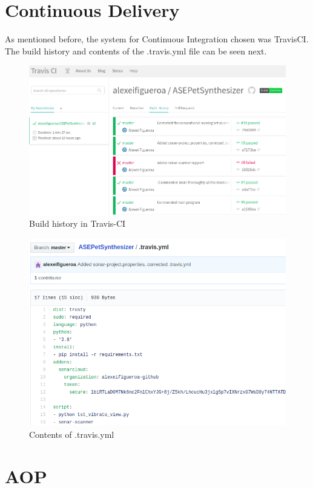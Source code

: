 \documentclass[margin,line,a4paper,authoryear,12pt]{report}
\begin{document}
\chapter{Continuous Delivery}
As mentioned before, the system for Continuous Integration chosen was TravisCI.
The build history and contents of the .travis.yml file can be seen next.
\begin{figure}[h!]
    \centering
    \includegraphics[width=0.8\linewidth]{TravisCI.png}
    \caption{Build history in Travis-CI}
    \label{fig:TravisCI}
\end{figure}
\begin{figure}[h!]
    \centering
    \includegraphics[width=0.8\linewidth]{travis_yml.png}
    \caption{Contents of .travis.yml}
    \label{fig:TravisCI}
\end{figure}
\chapter{AOP}
\end{document}
